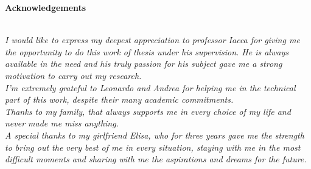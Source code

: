 \thispagestyle{empty}

\begin{center}
  {\bf \Huge Acknowledgements}
\end{center}

\vspace{4cm}


\emph{\\I would like to express my deepest appreciation to professor Iacca for giving me the opportunity to do this work of thesis under his supervision. He is always available in the need and his truly passion for his subject gave me a strong motivation to carry out my research.\\I’m extremely grateful to Leonardo and Andrea for helping me in the technical part of this work, despite their many academic commitments.\\Thanks to my family, that always supports me in every choice of my life and never made me miss anything.\\A special thanks to my girlfriend Elisa, who for three years gave me the strength to bring out the very best of me in every situation, staying with me in the most difficult moments and sharing with me the aspirations and dreams for the future.
}
